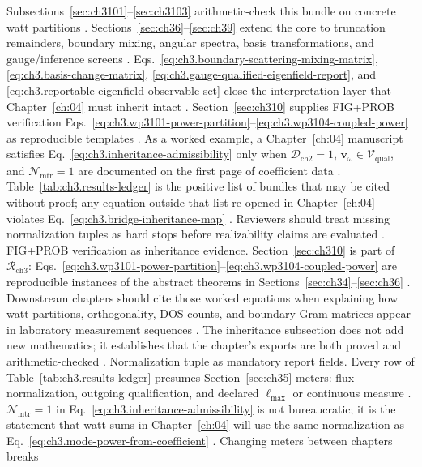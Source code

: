 Subsections~\ref{sec:ch3101}--\ref{sec:ch3103} arithmetic-check this bundle on concrete watt partitions \cite{hansen1988}.
Sections~\ref{sec:ch36}--\ref{sec:ch39} extend the core to truncation remainders, boundary mixing, angular spectra, basis transformations, and
gauge/inference screens \cite{harrington2001}. Eqs.~\eqref{eq:ch3.boundary-scattering-mixing-matrix},
\eqref{eq:ch3.basis-change-matrix}, \eqref{eq:ch3.gauge-qualified-eigenfield-report}, and \eqref{eq:ch3.reportable-eigenfield-observable-set}
close the interpretation layer that Chapter~\ref{ch:04} must inherit intact \cite{hansen1988}. Section~\ref{sec:ch310} supplies
FIG+PROB verification Eqs.~\eqref{eq:ch3.wp3101-power-partition}--\eqref{eq:ch3.wp3104-coupled-power} as reproducible templates
\cite{harrington2001}.
As a worked example, a Chapter~\ref{ch:04} manuscript satisfies Eq.~\eqref{eq:ch3.inheritance-admissibility} only when \(\mathcal{D}_{\mathrm{ch2}}=1\),
\(\mathbf{v}_\omega\in\mathcal{V}_{\mathrm{qual}}\), and \(\mathcal{N}_{\mathrm{mtr}}=1\) are documented on the first page of coefficient data
\cite{stratton1941}. Table~\ref{tab:ch3.results-ledger} is the positive list of bundles that may be cited without proof;
any equation outside that list re-opened in Chapter~\ref{ch:04} violates Eq.~\eqref{eq:ch3.bridge-inheritance-map}
\cite{harrington2001}. Reviewers should treat missing normalization tuples as hard stops before realizability claims are evaluated
\cite{poynting1884}.
FIG+PROB verification as inheritance evidence. Section~\ref{sec:ch310} is part of \(\mathcal{R}_{\mathrm{ch3}}\): Eqs.~\eqref{eq:ch3.wp3101-power-partition}--\eqref{eq:ch3.wp3104-coupled-power}
are reproducible instances of the abstract theorems in Sections~\ref{sec:ch34}--\ref{sec:ch36} \cite{hansen1988}.
Downstream chapters should cite those worked equations when explaining how watt partitions, orthogonality, DOS counts, and boundary Gram matrices
appear in laboratory measurement sequences \cite{harrington2001}. The inheritance subsection does not add new mathematics; it establishes that the
chapter's exports are both proved and arithmetic-checked \cite{stratton1941}.
Normalization tuple as mandatory report fields. Every row of Table~\ref{tab:ch3.results-ledger} presumes Section~\ref{sec:ch35} meters: flux normalization, outgoing qualification, and declared
\(\ell_{\max}\) or continuous measure \cite{poynting1884}. \(\mathcal{N}_{\mathrm{mtr}}=1\) in
Eq.~\eqref{eq:ch3.inheritance-admissibility} is not bureaucratic; it is the statement that watt sums in Chapter~\ref{ch:04} will use the same
normalization as Eq.~\eqref{eq:ch3.mode-power-from-coefficient} \cite{stratton1941}. Changing meters between chapters breaks
